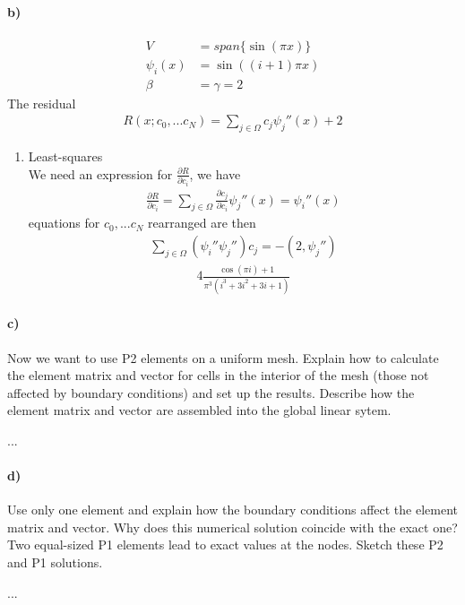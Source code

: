 \documentclass[11pt,a4paper]{article}
\begin{document}
\paragraph*{b)}
\begin{align}
V &= span\{\sin (\pi x)\}\\
\psi_i(x) &= \sin\left((i+1)\pi x\right)\\
\beta &= \gamma = 2
\end{align}
The residual
\begin{align*}
R(x;c_0,...c_N) = \sum_{j\in\Omega}c_j\psi_j''(x)+2
\end{align*}
\begin{enumerate}
\item Least-squares\\
We need an expression for $\frac{\partial R}{\partial c_i}$, we have
\begin{align*}
\frac{\partial R}{\partial c_i} = \sum_{j\in\Omega}\frac{\partial c_j}{\partial c_i}\psi_j''(x) = \psi_i''(x)
\end{align*}
equations for $c_0,...c_N$ rearranged are then 
\begin{align*}
\sum_{j\in\Omega}(\psi_i''\psi_j'')c_j = -(2,\psi_j'')
\end{align*}
\begin{align*}
4 \frac{\cos\left(\pi i\right) + 1}{\pi^{3} \left(i^{3} + 3 i^{2} + 3 i + 1\right)}
\end{align*}
\end{enumerate}

\paragraph*{c)}
Now we want to use P2 elements on a uniform mesh. Explain how to calculate the element matrix and vector for cells in the interior of the mesh (those not affected by boundary conditions) and set up the results. Describe how the element matrix and vector are assembled into the global linear sytem.

...

\paragraph*{d)}
Use only one element and explain how the boundary conditions affect the element matrix and vector. Why does this numerical solution coincide with the exact one? Two equal-sized P1 elements lead to exact values at the nodes. Sketch these P2 and P1 solutions.

...
\end{document}
